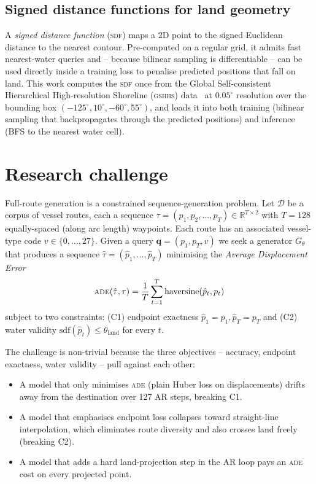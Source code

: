 \documentclass[oneside, a4paper, onecolumn, 11pt]{article}
\newcommand{\ade}{\textsc{ade}}
\newcommand{\sdf}{\textsc{sdf}}
\begin{document}
\subsection{Signed distance functions for land geometry}

A \emph{signed distance function} (\sdf) maps a 2D point to the signed
Euclidean distance to the nearest contour.  Pre-computed on a regular
grid, it admits fast nearest-water queries and -- because bilinear
sampling is differentiable -- can be used directly inside a training
loss to penalise predicted positions that fall on land.  This work
computes the \sdf{} once from the Global Self-consistent Hierarchical
High-resolution Shoreline (\textsc{gshhs})
data~\cite{wessel1996gshhs} at $0.05^\circ$ resolution over the
bounding box $(-125^\circ, 10^\circ, -60^\circ, 55^\circ)$, and loads
it into both training (bilinear sampling that backpropagates through
the predicted positions) and inference (BFS to the nearest water cell).

\section{Research challenge}\label{sec:challenge}

Full-route generation is a constrained sequence-generation problem.
Let $\mathcal{D}$ be a corpus of vessel routes, each a sequence
$\tau = (p_1, p_2, \ldots, p_T) \in \mathbb{R}^{T \times 2}$ with
$T = 128$ equally-spaced (along arc length) waypoints.  Each route has
an associated vessel-type code $v \in \{0, \ldots, 27\}$.
Given a query $\mathbf{q} = (p_1, p_T, v)$ we seek a generator
$G_\theta$ that produces a sequence
$\hat\tau = (\hat p_1, \ldots, \hat p_T)$ minimising the
\emph{Average Displacement Error}
\[
  \ade(\hat\tau, \tau)
    = \frac{1}{T} \sum_{t=1}^{T} \mathrm{haversine}(\hat p_t, p_t)
\]
subject to two constraints:
(C1) endpoint exactness $\hat p_1 = p_1, \hat p_T = p_T$ and
(C2) water validity $\mathrm{sdf}(\hat p_t) \leq \theta_{\mathrm{land}}$
     for every $t$.

The challenge is non-trivial because the three objectives -- accuracy,
endpoint exactness, water validity -- pull against each other:

\begin{itemize}[leftmargin=*]
  \item A model that only minimises \ade{} (plain Huber loss on
        displacements) drifts away from the destination over 127 AR
        steps, breaking C1.
  \item A model that emphasises endpoint loss collapses toward
        straight-line interpolation, which eliminates route diversity
        and also crosses land freely (breaking C2).
  \item A model that adds a hard land-projection step in the AR loop
        pays an \ade{} cost on every projected point.
\end{itemize}
\end{document}
